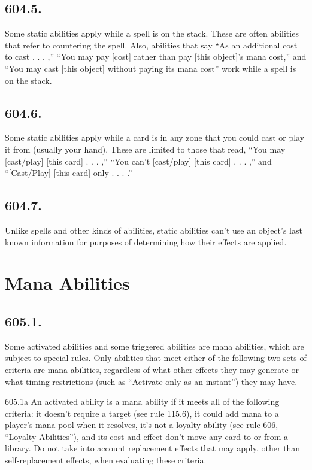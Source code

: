 \subsection*{604.5.}
Some static abilities apply while a spell is on the stack. These are often abilities that refer to countering the spell. Also, abilities that say “As an additional cost to cast . . . ,” “You may pay [cost] rather than pay [this object]’s mana cost,” and “You may cast [this object] without paying its mana cost” work while a spell is on the stack.

\subsection*{604.6.}
Some static abilities apply while a card is in any zone that you could cast or play it from (usually your hand). These are limited to those that read, “You may [cast/play] [this card] . . . ,” “You can’t [cast/play] [this card] . . . ,” and “[Cast/Play] [this card] only . . . .”

\subsection*{604.7.}
Unlike spells and other kinds of abilities, static abilities can’t use an object’s last known information for purposes of determining how their effects are applied.

\section{Mana Abilities}
\subsection*{605.1.}
Some activated abilities and some triggered abilities are mana abilities, which are subject to special rules. Only abilities that meet either of the following two sets of criteria are mana abilities, regardless of what other effects they may generate or what timing restrictions (such as “Activate only as an instant”) they may have.

605.1a An activated ability is a mana ability if it meets all of the following criteria: it doesn’t require a target (see rule 115.6), it could add mana to a player’s mana pool when it resolves, it’s not a loyalty ability (see rule 606, “Loyalty Abilities”), and its cost and effect don’t move any card to or from a library. Do not take into account replacement effects that may apply, other than self-replacement effects, when evaluating these criteria.

